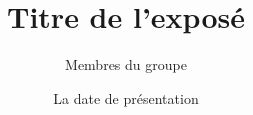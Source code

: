 \documentclass[aspectratio=169]{beamer}
\title{Titre de l'exposé}
\author{Membres du groupe}
\institute{Le nom du groupe}
\date{La date de présentation}
\begin{document}

\begin{frame}
  \titlepage
\end{frame}

\end{document}
